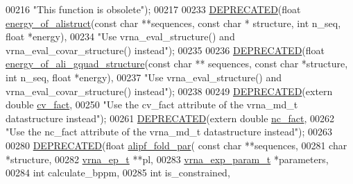 \begin{DoxyCode}
00216           \textcolor{stringliteral}{"This function is obsolete"});
00217 
00233 \mbox{\hyperlink{alifold_8h_aab347a3c03fbe8e7319551b9fa0cce4a}{DEPRECATED}}(\textcolor{keywordtype}{float} \mbox{\hyperlink{group__consensus__fold_ga1c48869c03b49a342bf4cbdd61900081}{energy\_of\_alistruct}}(\textcolor{keyword}{const} \textcolor{keywordtype}{char} **sequences, \textcolor{keyword}{const} \textcolor{keywordtype}{char} *
      structure, \textcolor{keywordtype}{int} n\_seq, \textcolor{keywordtype}{float} *energy),
00234            \textcolor{stringliteral}{"Use vrna\_eval\_structure() and vrna\_eval\_covar\_structure() instead"});
00235 
00236 \mbox{\hyperlink{alifold_8h_aab347a3c03fbe8e7319551b9fa0cce4a}{DEPRECATED}}(\textcolor{keywordtype}{float} \mbox{\hyperlink{alifold_8h_a867057bf4da81917bd34c356285e99d9}{energy\_of\_ali\_gquad\_structure}}(\textcolor{keyword}{const} \textcolor{keywordtype}{char} **
      sequences, \textcolor{keyword}{const} \textcolor{keywordtype}{char} *structure, \textcolor{keywordtype}{int} n\_seq, \textcolor{keywordtype}{float} *energy),
00237           \textcolor{stringliteral}{"Use vrna\_eval\_structure() and vrna\_eval\_covar\_structure() instead"});
00238 
00249 \mbox{\hyperlink{alifold_8h_aab347a3c03fbe8e7319551b9fa0cce4a}{DEPRECATED}}(\textcolor{keyword}{extern}  \textcolor{keywordtype}{double}  \mbox{\hyperlink{group__consensus__fold_gaf3cbac6ff5d706d6e414677841ddf94c}{cv\_fact}},
00250           \textcolor{stringliteral}{"Use the cv\_fact attribute of the vrna\_md\_t datastructure instead"});
00261 \mbox{\hyperlink{alifold_8h_aab347a3c03fbe8e7319551b9fa0cce4a}{DEPRECATED}}(\textcolor{keyword}{extern}  \textcolor{keywordtype}{double}  \mbox{\hyperlink{group__consensus__fold_ga502948a122a2af5b914355b1f3ea2f61}{nc\_fact}},
00262           \textcolor{stringliteral}{"Use the nc\_fact attribute of the vrna\_md\_t datastructure instead"});
00263 
00280 \mbox{\hyperlink{alifold_8h_aab347a3c03fbe8e7319551b9fa0cce4a}{DEPRECATED}}(\textcolor{keywordtype}{float} \mbox{\hyperlink{group__consensus__pf__fold_gab46954fb0ed3b6d5631e7f9b802978cd}{alipf\_fold\_par}}( \textcolor{keyword}{const} \textcolor{keywordtype}{char} **sequences,
00281                       \textcolor{keywordtype}{char} *structure,
00282                       \mbox{\hyperlink{group__struct__utils_structvrna__elem__prob__s}{vrna\_ep\_t}} **pl,
00283                       \mbox{\hyperlink{group__energy__parameters_structvrna__exp__param__s}{vrna\_exp\_param\_t}} *parameters,
00284                       \textcolor{keywordtype}{int} calculate\_bppm,
00285                       \textcolor{keywordtype}{int} is\_constrained,

\end{DoxyCode}
